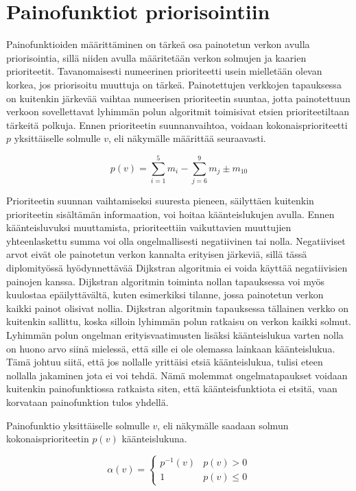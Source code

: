 \section{Painofunktiot priorisointiin} \label{ch:10_painofunktiot_priorisointiin}

  Painofunktioiden määrittäminen on tärkeä osa painotetun verkon avulla priorisointia, sillä niiden avulla määritetään verkon solmujen ja kaarien prioriteetit.
  Tavanomaisesti numeerinen prioriteetti usein mielletään olevan korkea, jos priorisoitu muuttuja on tärkeä.
  Painotettujen verkkojen tapauksessa on kuitenkin järkevää vaihtaa numeerisen prioriteetin suuntaa, jotta painotettuun verkoon sovellettavat lyhimmän polun algoritmit toimisivat etsien prioriteetiltaan tärkeitä polkuja. Ennen prioriteetin suunnanvaihtoa, voidaan kokonaisprioriteetti \(p\) yksittäiselle solmulle \(v\), eli näkymälle määrittää seuraavasti.

  \[p(v) = \sum\limits_{i=1}^{5} m_i - \sum\limits_{j=6}^{9} m_j \pm m_{10}\]

  Prioriteetin suunnan vaihtamiseksi suuresta pieneen, säilyttäen kuitenkin prioriteetin sisältämän informaation, voi hoitaa käänteislukujen avulla.
  Ennen käänteisluvuksi muuttamista, prioriteettiin vaikuttavien muuttujien yhteenlaskettu summa voi olla ongelmallisesti negatiivinen tai nolla.
  Negatiiviset arvot eivät ole painotetun verkon kannalta erityisen järkeviä, sillä tässä diplomityössä hyödynnettävää Dijkstran algoritmia ei voida käyttää negatiivisien painojen kanssa.
  Dijkstran algoritmin toiminta nollan tapauksessa voi myös kuulostaa epäilyttävältä, kuten esimerkiksi tilanne, jossa painotetun verkon kaikki painot olisivat nollia.
  Dijkstran algoritmin tapauksessa tällainen verkko on kuitenkin sallittu, koska silloin lyhimmän polun ratkaisu on verkon kaikki solmut.
  Lyhimmän polun ongelman erityisvaatimusten lisäksi käänteislukua varten nolla on huono arvo siinä mielessä, että sille ei ole olemassa lainkaan käänteislukua.
  Tämä johtuu siitä, että jos nollalle yrittäisi etsiä käänteislukua, tulisi eteen nollalla jakaminen jota ei voi tehdä.
  Nämä molemmat ongelmatapaukset voidaan kuitenkin painofunktiossa ratkaista siten, että käänteisfunktiota ei etsitä, vaan korvataan painofunktion tulos yhdellä.

  Painofunktio yksittäiselle solmulle \(v\), eli näkymälle saadaan solmun kokonaisprioriteetin \(p(v)\) käänteislukuna.

  \[\alpha(v) = \begin{cases}
    p^{-1}(v) & p(v) > 0 \\
    1 & p(v) \leq 0
  \end{cases}\]

